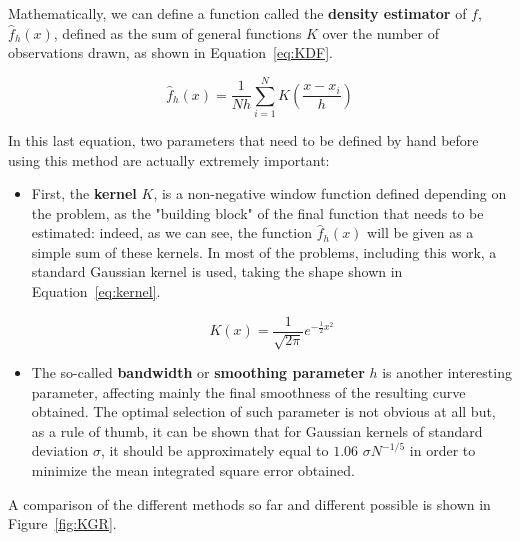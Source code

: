 \documentclass[a4paper, 11pt]{report}
\begin{document}
Mathematically, we can define a function called the \textbf{density estimator} of $f$, $\hat{f}_h(x)$, defined as the sum of general functions $K$ over the number of observations drawn, as shown in Equation~\ref{eq:KDF}.

\begin{equation}
\label{eq:KDF}
\hat{f}_h(x) = \frac{1}{Nh} \sum_{i=1}^{N} K \left (\frac{x-x_i}{h} \right )
\end{equation}

In this last equation, two parameters that need to be defined by hand before using this method are actually extremely important:
\begin{itemize}
\item First, the \textbf{kernel} $K$, is a non-negative window function defined depending on the problem, as the "building block" of the final function that needs to be estimated: indeed, as we can see, the function $\hat{f}_h(x)$ will be given as a simple sum of these kernels. In most of the problems, including this work, a standard Gaussian kernel is used, taking the shape shown in Equation~\ref{eq:kernel}.

\begin{equation}
\label{eq:kernel}
K(x) = \frac{1}{\sqrt{2 \pi}} e^{-\frac{1}{2} x^2}
\end{equation}

\item The so-called \textbf{bandwidth} or \textbf{smoothing parameter} $h$ is another interesting parameter, affecting mainly the final smoothness of the resulting curve obtained. The optimal selection of such parameter is not obvious at all \cite{bandwidth} but, as a rule of thumb, it can be shown that for Gaussian kernels of standard deviation $\sigma$, it should be approximately equal to $1.06$ $\sigma N^{-1/5}$ in order to minimize the mean integrated square error obtained. 
\end{itemize}

A comparison of the different methods so far and different possible is shown in Figure~\ref{fig:KGR}.
\end{document}
